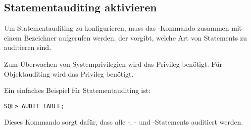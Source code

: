       \subsection{Statementauditing aktivieren}
        \label{statementauditing}
        Um Statementauditing zu konfigurieren, muss das -Kommando zusammen mit einem Bezeichner aufgerufen werden, der vorgibt, welche Art von Statements zu auditieren sind.
        \begin{merke}
          Zum \"Uberwachen von Systemprivilegien wird das Privileg  ben\"otigt. F\"ur Objektauditing wird das Privileg  ben\"otigt.
        \end{merke}
        Ein einfaches Beispiel f\"ur Statementauditing ist:
        \begin{lstlisting}[caption={Statementauditing aktivieren},label=admin802,language=oracle_sql]
SQL> AUDIT TABLE;
        \end{lstlisting}
        Dieses Kommando sorgt daf\"ur, dass alle -, - und -State\-ments auditiert werden.

        \begin{literaturinternet}
          \item \cite{i2059073}
        \end{literaturinternet}

